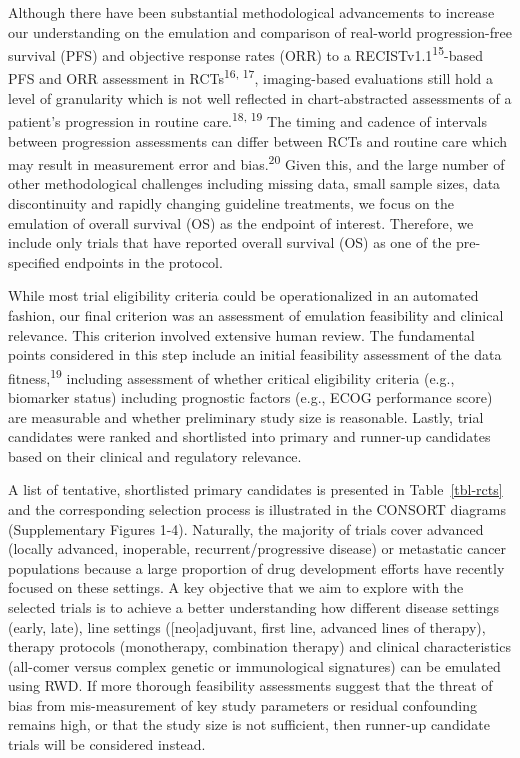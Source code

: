\documentclass[
  letterpaper,
  DIV=11,
  numbers=noendperiod]{scrartcl}
\begin{document}
Although there have been substantial methodological advancements to
increase our understanding on the emulation and comparison of real-world
progression-free survival (PFS) and objective response rates (ORR) to a
RECISTv1.1\textsuperscript{15}-based PFS and ORR assessment in
RCTs\textsuperscript{16, 17}, imaging-based evaluations still hold a
level of granularity which is not well reflected in chart-abstracted
assessments of a patient's progression in routine
care.\textsuperscript{18, 19} The timing and cadence of intervals
between progression assessments can differ between RCTs and routine care
which may result in measurement error and bias.\textsuperscript{20}
Given this, and the large number of other methodological challenges
including missing data, small sample sizes, data discontinuity and
rapidly changing guideline treatments, we focus on the emulation of
overall survival (OS) as the endpoint of interest. Therefore, we include
only trials that have reported overall survival (OS) as one of the
pre-specified endpoints in the protocol.

While most trial eligibility criteria could be operationalized in an
automated fashion, our final criterion was an assessment of emulation
feasibility and clinical relevance. This criterion involved extensive
human review. The fundamental points considered in this step include an
initial feasibility assessment of the data fitness,\textsuperscript{19}
including assessment of whether critical eligibility criteria (e.g.,
biomarker status) including prognostic factors (e.g., ECOG performance
score) are measurable and whether preliminary study size is reasonable.
Lastly, trial candidates were ranked and shortlisted into primary and
runner-up candidates based on their clinical and regulatory relevance.

A list of tentative, shortlisted primary candidates is presented in
Table~\ref{tbl-rcts} and the corresponding selection process is
illustrated in the CONSORT diagrams (Supplementary Figures 1-4).
Naturally, the majority of trials cover advanced (locally advanced,
inoperable, recurrent/progressive disease) or metastatic cancer
populations because a large proportion of drug development efforts have
recently focused on these settings. A key objective that we aim to
explore with the selected trials is to achieve a better understanding
how different disease settings (early, late), line settings
({[}neo{]}adjuvant, first line, advanced lines of therapy), therapy
protocols (monotherapy, combination therapy) and clinical
characteristics (all-comer versus complex genetic or immunological
signatures) can be emulated using RWD. If more thorough feasibility
assessments suggest that the threat of bias from mis-measurement of key
study parameters or residual confounding remains high, or that the study
size is not sufficient, then runner-up candidate trials will be
considered instead.
\end{document}
